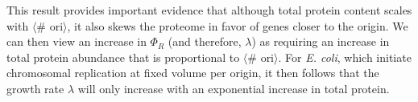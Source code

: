 
%
%
%
%
%

This result provides important evidence that although total protein content
scales with $\langle$\# ori$\rangle$, it also skews the proteome in favor of
genes closer to the origin.  We can then view an increase in $\Phi_R$ (and
therefore, $\lambda$) as requiring an increase in total protein abundance that
is proportional to $\langle$\# ori$\rangle$. For \textit{E. coli}, which
initiate chromosomal replication at fixed volume per origin, it then follows
that the growth rate $\lambda$ will only increase with an exponential increase
in total protein.

